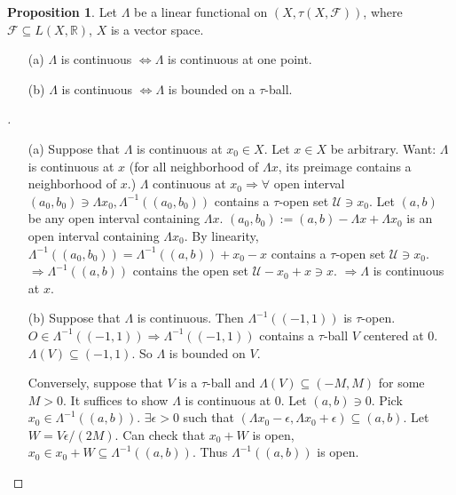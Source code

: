 \documentclass{article}
\theoremstyle{definition}
\newtheorem{prop}{Proposition}
\newenvironment{proofs}[1][\proofname]{%
  \begin{proof}[#1]$ $\par\nobreak\ignorespaces
}{%
  \end{proof}
}
\newcommand{\F}{\mathcal F}
\newcommand{\RR}{\mathbb R}
\newcommand{\U}{\mathcal U}
\newcommand{\Ra}{\Rightarrow}
\newcommand{\Lra}{\Leftrightarrow}
\begin{document}
\begin{prop}
	Let $\Lambda$ be a linear functional on $(X, \tau(X, \F))$, where $\F \subseteq L(X, \RR)$, $X$ is a vector space.
	\begin{enumerate}
		\item[(a)] $\Lambda$ is continuous $\Lra \Lambda$ is continuous at one point.

		\item[(b)] $\Lambda$ is continuous $\Lra \Lambda$ is bounded on a $\tau$-ball.
	\end{enumerate}
\end{prop}

\begin{proofs}
	\begin{enumerate}
		\item[(a)] Suppose that $\Lambda$ is continuous at $x_0 \in X$.
			Let $x \in X$ be arbitrary.
			Want: $\Lambda$ is continuous at $x$ (for all neighborhood of $\Lambda x$, its preimage contains a neighborhood of $x$.)
			$\Lambda$ continuous at $x_0 \Ra \forall$ open interval $(a_0, b_0) \ni \Lambda x_0, \Lambda^{-1}((a_0, b_0))$ contains a $\tau$-open set $\U \ni x_0$.
			Let $(a, b)$ be any open interval containing $\Lambda x$.
			$(a_0, b_0) := (a, b) - \Lambda x + \Lambda x_0$ is an open interval containing $\Lambda x_0$.
			By linearity, $\Lambda^{-1}((a_0, b_0)) = \Lambda^{-1}((a, b)) + x_0 - x$ contains a $\tau$-open set $\U \ni x_0$.
			$\Ra \Lambda^{-1}((a, b))$ contains the open set $\U - x_0 + x \ni x$.
			$\Ra \Lambda$ is continuous at $x$.

		\item[(b)] Suppose that $\Lambda$ is continuous.
			Then $\Lambda^{-1}((-1, 1))$ is $\tau$-open.
			$O \in \Lambda^{-1}((-1, 1)) \Ra \Lambda^{-1}((-1, 1))$ contains a $\tau$-ball $V$ centered at 0.
			$\Lambda(V) \subseteq (-1, 1)$.
			So $\Lambda$ is bounded on $V$.
			
			\par Conversely, suppose that $V$ is a $\tau$-ball and $\Lambda(V) \subseteq (-M, M)$ for some $M > 0$.
			It suffices to show $\Lambda$ is continuous at 0.
			Let $(a, b) \ni 0$.
			Pick $x_0 \in \Lambda^{-1}((a, b))$.
			$\exists \epsilon > 0$ such that $(\Lambda x_0 - \epsilon, \Lambda x_0 + \epsilon) \subseteq (a, b)$.
			Let $W = V\epsilon/(2M) $.
			Can check that $x_0 + W$ is open, $x_0 \in x_0 + W \subseteq \Lambda^{-1}((a, b))$.
			Thus $\Lambda^{-1}((a, b))$ is open.
	\end{enumerate}
\end{proofs}
\end{document}
